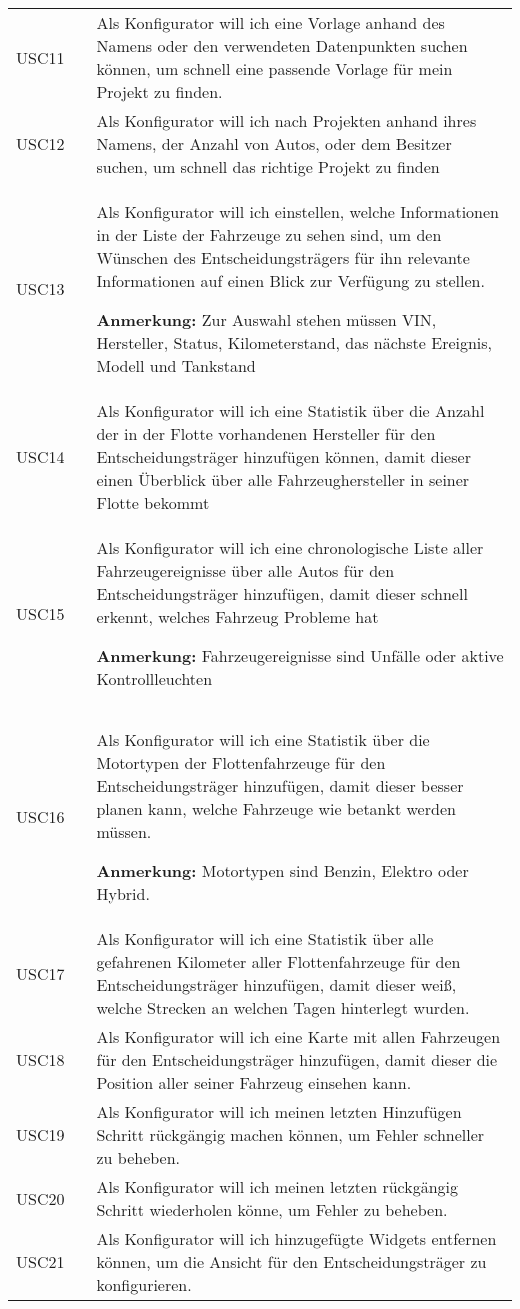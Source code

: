 \begin{footnotesize}
\begin{longtable}[i i L]{ p{} p{} p{} }
      USC11 & & Als Konfigurator will ich eine Vorlage anhand des Namens oder den verwendeten Datenpunkten suchen können, um schnell eine passende Vorlage für mein Projekt zu finden. \\
      USC12 & & Als Konfigurator will ich nach Projekten anhand ihres Namens, der Anzahl von Autos, oder dem Besitzer suchen, um schnell das richtige Projekt zu finden \\
      USC13 & & Als Konfigurator will ich einstellen, welche Informationen in der Liste der Fahrzeuge zu sehen sind, um den Wünschen des Entscheidungsträgers für ihn relevante Informationen auf einen Blick zur Verfügung zu stellen.

      \textbf{Anmerkung:} Zur Auswahl stehen müssen VIN, Hersteller, Status, Kilometerstand, das nächste Ereignis, Modell und Tankstand \\
      USC14 & & Als Konfigurator will ich eine Statistik über die Anzahl der in der Flotte vorhandenen Hersteller für den Entscheidungsträger hinzufügen können, damit dieser einen Überblick über alle Fahrzeughersteller in seiner Flotte bekommt \\
      USC15 & & Als Konfigurator will ich eine chronologische Liste aller Fahrzeugereignisse über alle Autos für den Entscheidungsträger hinzufügen, damit dieser schnell erkennt, welches Fahrzeug Probleme hat 
      
      \textbf{Anmerkung:} Fahrzeugereignisse sind Unfälle oder aktive Kontrollleuchten \\ 
      USC16 & & Als Konfigurator will ich eine Statistik über die Motortypen der Flottenfahrzeuge für den Entscheidungsträger hinzufügen, damit dieser besser planen kann, welche Fahrzeuge wie betankt werden müssen. 
      
      \textbf{Anmerkung:} Motortypen sind Benzin, Elektro oder Hybrid.
      \\
      USC17 & & Als Konfigurator will ich eine Statistik über alle gefahrenen Kilometer aller Flottenfahrzeuge für den Entscheidungsträger hinzufügen, damit dieser weiß, welche Strecken an welchen Tagen hinterlegt wurden. \\
      USC18 & & Als Konfigurator will ich eine Karte mit allen Fahrzeugen für den Entscheidungsträger hinzufügen, damit dieser die Position aller seiner Fahrzeug einsehen kann. \\
      USC19 & & Als Konfigurator will ich meinen letzten Hinzufügen Schritt rückgängig machen können, um Fehler schneller zu beheben. \\
      USC20 & & Als Konfigurator will ich meinen letzten rückgängig Schritt wiederholen könne, um Fehler zu beheben. \\
      USC21 & & Als Konfigurator will ich hinzugefügte Widgets entfernen können, um die Ansicht für den Entscheidungsträger zu konfigurieren. \\

      \bottomrule
    \end{longtable}
  \end{footnotesize}
  \rmfamily
